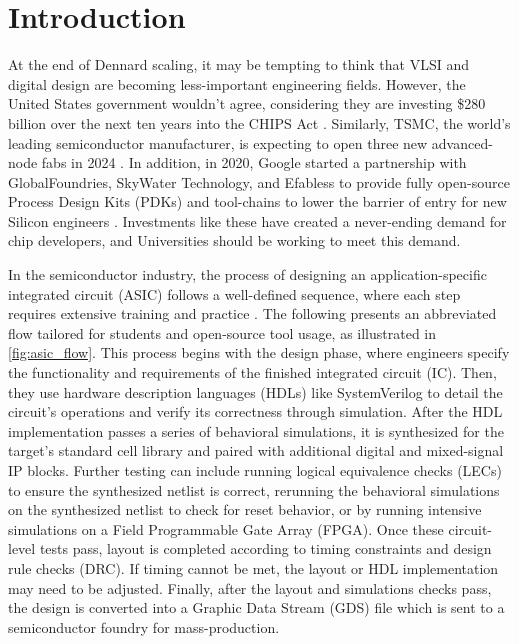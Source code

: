 
\chapter{Introduction}
\label{chapter:introduction}

At the end of Dennard scaling, it may be tempting to think that VLSI and digital design are becoming less-important engineering fields. However, the United States government wouldn't agree, considering they are investing \$280 billion over the next ten years into the CHIPS Act \cite{mckinsey}. Similarly, TSMC, the world's leading semiconductor manufacturer, is expecting to open three new advanced-node fabs in 2024 \cite{taipeitimes}. In addition, in 2020, Google started a partnership with GlobalFoundries, SkyWater Technology, and Efabless to provide fully open-source Process Design Kits (PDKs) and tool-chains to lower the barrier of entry for new Silicon engineers \cite{GooglePartnersWithSkyWater, googleSilicon}. Investments like these have created a never-ending demand for chip developers, and Universities should be working to meet this demand.



In the semiconductor industry, the process of designing an application-specific integrated circuit (ASIC) follows a well-defined sequence, where each step requires extensive training and practice \cite{intelDesignFlow, anysiliconDesignFlow, kynixDesignFlow}. The following presents an abbreviated flow tailored for students and open-source tool usage, as illustrated in \autoref{fig:asic_flow}. This process begins with the design phase, where engineers specify the functionality and requirements of the finished integrated circuit (IC). Then, they use hardware description languages (HDLs) like SystemVerilog to detail the circuit's operations and verify its correctness through simulation. After the HDL implementation passes a series of behavioral simulations, it is synthesized for the target's standard cell library and paired with additional digital and mixed-signal IP blocks. Further testing can include running logical equivalence checks (LECs) to ensure the synthesized netlist is correct, rerunning the behavioral simulations on the synthesized netlist to check for reset behavior, or by running intensive simulations on a Field Programmable Gate Array (FPGA). Once these circuit-level tests pass, layout is completed according to timing constraints and design rule checks (DRC). If timing cannot be met, the layout or HDL implementation may need to be adjusted. Finally, after the layout and simulations checks pass, the design is converted into a Graphic Data Stream (GDS) file which is sent to a semiconductor foundry for mass-production.

